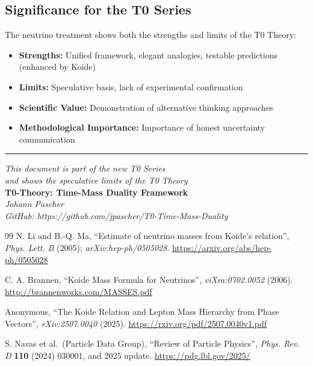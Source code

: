 	\subsection{Significance for the T0 Series}
	
	The neutrino treatment shows both the strengths and limits of the T0 Theory:
	
	\begin{itemize}
		\item \textbf{Strengths:} Unified framework, elegant analogies, testable predictions (enhanced by Koide)
		\item \textbf{Limits:} Speculative basis, lack of experimental confirmation
		\item \textbf{Scientific Value:} Demonstration of alternative thinking approaches
		\item \textbf{Methodological Importance:} Importance of honest uncertainty communication
	\end{itemize}
	
	\begin{center}
		\hrule
		\vspace{0.5cm}
		\textit{This document is part of the new T0 Series}\\
		\textit{and shows the speculative limits of the T0 Theory}\\
		\vspace{0.3cm}
		\textbf{T0-Theory: Time-Mass Duality Framework}\\
		\textit{Johann Pascher}\\
		
		\textit{GitHub: https://github.com/jpascher/T0-Time-Mass-Duality}
		\vspace{0.3cm}
	\end{center}
	
	\begin{thebibliography}{99}
		N. Li and B.-Q. Ma, ``Estimate of neutrino masses from Koide's relation'', \textit{Phys. Lett. B} (2005); \textit{arXiv:hep-ph/0505028}.
		\url{https://arxiv.org/abs/hep-ph/0505028}
		
		C. A. Brannen, ``Koide Mass Formula for Neutrinos'', \textit{viXra:0702.0052} (2006).
		\url{http://brannenworks.com/MASSES.pdf}
		
		Anonymous, ``The Koide Relation and Lepton Mass Hierarchy from Phase Vectors'', \textit{rXiv:2507.0040} (2025).
		\url{https://rxiv.org/pdf/2507.0040v1.pdf}
		
		S. Navas et al.\ (Particle Data Group), ``Review of Particle Physics'', \textit{Phys. Rev. D} \textbf{110} (2024) 030001, and 2025 update.
		\url{https://pdg.lbl.gov/2025/}
		
	\end{thebibliography}
	